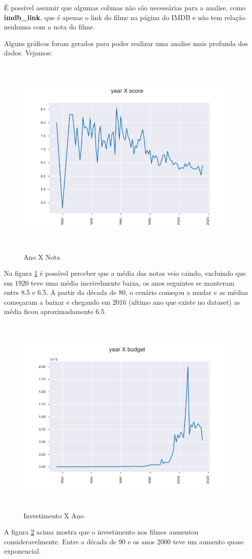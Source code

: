 É possível assumir que algumas colunas não são necessárias para a analise, como \textbf{imdb\_link}, que é apenas o link do filme na página do IMDB e não tem relação nenhuma com a nota do filme.

Alguns gráficos foram gerados para poder realizar uma analise mais profunda dos dados. Vejamos: 

\begin{figure}[H]
\centering
\includegraphics[height=10cm]{imagens/yearXscore.png}
\caption{Ano X Nota}
\label{yearXscore}
\end{figure}

Na figura \ref{yearXscore} é possível perceber que a média das notas veio caindo, excluindo que em 1920 teve uma média incrivelmente baixa, os anos seguintes se manteram entre 8.5 e 6.5. A partir da década de 80, o cenário começou a mudar e as médias começaram a baixar e chegando em 2016 (ultimo ano que existe no dataset) as média ficou aproximadamente 6.5.

\begin{figure}[H]
\centering
\includegraphics[height=10cm]{imagens/yearXbudget.png}
\caption{Investimento X Ano}
\label{budgetXyear}
\end{figure}
A figura \ref{budgetXyear} acima mostra que o investimento nos filmes aumentou consideravelmente. Entre a década de 90 e os anos 2000 teve um aumento quase exponencial.

